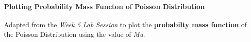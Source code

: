 \documentclass[11pt]{article}
\begin{document}
    \begin{center}
    \end{center}
    { \hspace*{\fill} \\}
    
    \paragraph{Plotting Probability Mass Functon of Poisson
Distribution}\label{plotting-probability-mass-functon-of-poisson-distribution}

    Adapted from the \emph{Week 5 Lab Session} to plot the
\textbf{probabilty mass function} of the Poisson Distribution using the
value of \emph{Mu}.
\end{document}
